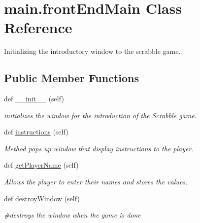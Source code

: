 \hypertarget{classmain_1_1front_end_main}{}\section{main.\+front\+End\+Main Class Reference}
\label{classmain_1_1front_end_main}


Initializing the introductory window to the scrabble game.  


\subsection*{Public Member Functions}
\begin{DoxyCompactItemize}
\item 
def \hyperlink{classmain_1_1front_end_main_ad177eca502ff731e6eb759018f5bd9a2}{\+\_\+\+\_\+init\+\_\+\+\_\+} (self)
\begin{DoxyCompactList}\small\item\em initializes the window for the introduction of the Scrabble game. \end{DoxyCompactList}\item 
def \hyperlink{classmain_1_1front_end_main_a35eedac35885932dbccfc15f66c636ef}{instructions} (self)
\begin{DoxyCompactList}\small\item\em Method pops up window that display instructions to the player. \end{DoxyCompactList}\item 
def \hyperlink{classmain_1_1front_end_main_a7aed02a11e563d6ac2c6f0bb626545ca}{get\+Player\+Name} (self)
\begin{DoxyCompactList}\small\item\em Allows the player to enter their names and stores the values. \end{DoxyCompactList}\item 
\mbox{\label{classmain_1_1front_end_main_a4c871341da008d74503dd33cfcb7aba1}} 
def \hyperlink{classmain_1_1front_end_main_a4c871341da008d74503dd33cfcb7aba1}{destroy\+Window} (self)
\begin{DoxyCompactList}\small\item\em \#destroys the window when the game is done \end{DoxyCompactList}\end{DoxyCompactItemize}
